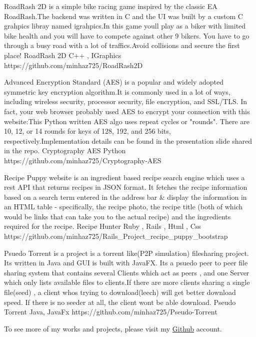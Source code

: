 \documentclass[]{awesome-cv}
\begin{document}
\vspace{-7mm}
\begin{cventries}
	\cventry
	{RoadRash 2D is a simple bike racing game inspired by the classic EA RoadRash.The backend was written in C and the UI was built by a custom C grahpics libray named igrahpics.In this game you\textquotesingle{}ll play as a biker with limited bike health and you will have to compete against other 9 bikers. You have to go through a busy road with a lot of traffics.Avoid collisions and secure the first place!}
	{RoadRash 2D}
	{C++ , IGraphics}
	{https://github.com/minhaz725/RoadRash2D}
	{}
	
	\vspace{-5mm}
	\cventry
	{Advanced Encryption Standard (AES) is a popular and widely adopted symmetric key encryption algorithm.It is commonly used in a lot of ways, including wireless security, processor security, file encryption, and SSL/TLS. In fact, your web browser probably used AES to encrypt your connection with this website:This Python written AES algo uses repeat cycles or "rounds". There are 10, 12, or 14 rounds for keys of 128, 192, and 256 bits, respectively.Implementation details can be found in the presentation slide shared in the repo.}
	{Cryptography AES}
	{Python}
	{https://github.com/minhaz725/Cryptography-AES}
	{}
	
	\vspace{-5mm}
	\cventry
	{Recipe Puppy website is an ingredient based recipe search engine which uses a rest API that returns recipes in JSON format. It fetches the recipe information based on a search term entered in the address bar \& display the information in an HTML table - specifically, the recipe photo, the recipe title (both of which would be links that can take you to the actual recipe) and the ingredients required for the recipe.}
	{Recipe Hunter}
	{Ruby , Rails , Html , Css}
	{https://github.com/minhaz725/Rails\_Project\_recipe\_puppy\_bootstrap}
	{}
	
	\vspace{-5mm}
	\cventry
	{Psuedo Torrent is a project is a torrent like(P2P simulation) filesharing project. It\textquotesingle{}s written in Java and GUI is built with JavaFX. It\textquotesingle{}s a psuedo peer to peer file sharing system that contains several \textquotedbl{}Clients\textquotedbl{} which act as peers , and one Server which only lists available files to clients.If there are more clients sharing a single file(seed) , a client who\textquotesingle{}s trying to download(leech) will get better download speed. If there is no seeder at all, the client won\textquotesingle{}t be able download.}
	{Pseudo Torrent}
	{Java, JavaFx}
	{https://github.com/minhaz725/Pseudo-Torrent}
	{}
	
	\vspace{-5mm}
	
	\cventry
	{}
	{To see more of my works and projects, please visit my \href{https://github.com/minhaz725}{\underline{Github}} account. }
	{}
	{}
	{}
	
	\vspace{-5mm}
\end{cventries}

\ 
\end{document}

